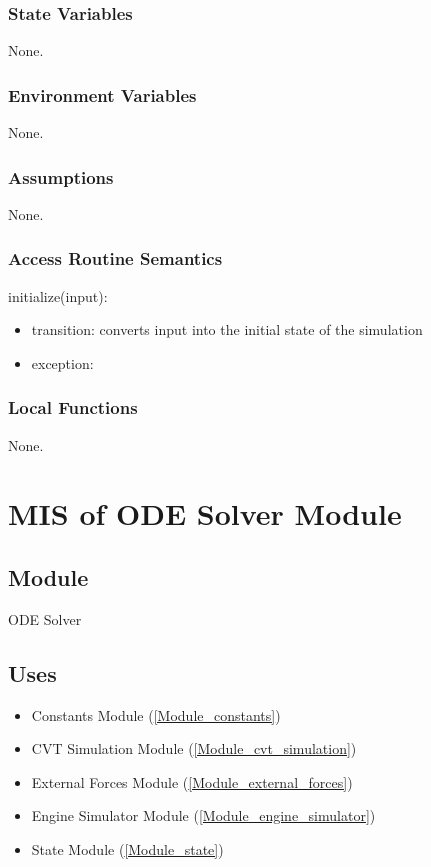 \documentclass[12pt, titlepage]{article}
\begin{document}
\subsubsection{State Variables}

None.

\subsubsection{Environment Variables}

None.

\subsubsection{Assumptions}

None.

\subsubsection{Access Routine Semantics}

\noindent initialize(input):
\begin{itemize}
\item transition: converts input into the initial state of the simulation
\item exception:  
\end{itemize}

\subsubsection{Local Functions}

None.

\newpage

\section{MIS of ODE Solver Module} \label{Module_ODE_solver}

\subsection{Module}

ODE Solver

\subsection{Uses}

\begin{itemize}
  \item Constants Module (\ref{Module_constants})
  \item CVT Simulation Module (\ref{Module_cvt_simulation})
  \item External Forces Module (\ref{Module_external_forces})
  \item Engine Simulator Module (\ref{Module_engine_simulator})
  \item State Module (\ref{Module_state})
\end{itemize}
\end{document}

